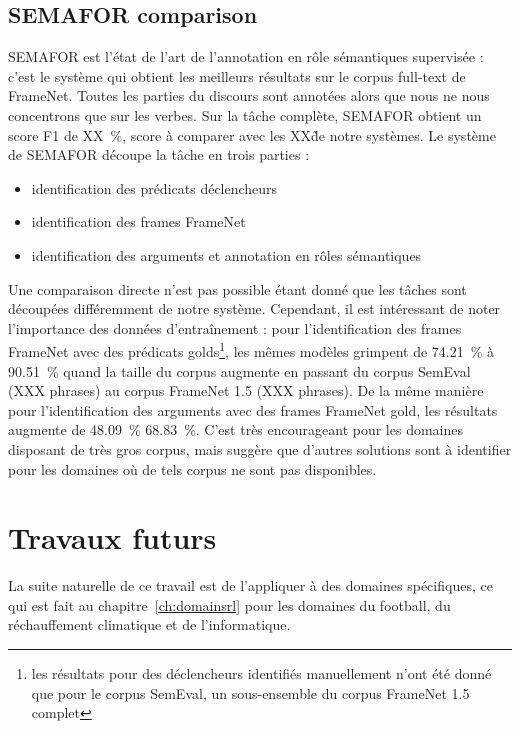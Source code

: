 \subsection{SEMAFOR comparison}

SEMAFOR \citep{das2014frame} est l'état de l'art de l'annotation en rôle
sémantiques supervisée : c'est le système qui obtient les meilleurs résultats
sur le corpus full-text de FrameNet. Toutes les parties du discours sont
annotées alors que nous ne nous concentrons que sur les verbes. Sur la tâche
complète, SEMAFOR obtient un score F1 de XX~\%, score à comparer avec les XX\~
de notre systèmes. Le système de SEMAFOR découpe la tâche en trois parties :

\begin{itemize}
    \item identification des prédicats déclencheurs
    \item identification des frames FrameNet
    \item identification des arguments et annotation en rôles sémantiques 
\end{itemize}

Une comparaison directe n'est pas possible étant donné que les tâches sont
découpées différemment de notre système. Cependant, il est intéressant de noter
l'importance des données d'entraînement : pour l'identification des frames
FrameNet avec des prédicats golds\footnote{les résultats pour des déclencheurs
identifiés manuellement n'ont été donné que pour le corpus SemEval, un
sous-ensemble du corpus FrameNet 1.5 complet}, les mêmes modèles grimpent de
74.21~\% à 90.51~\% quand la taille du corpus augmente en passant du corpus
SemEval (XXX phrases) au corpus FrameNet 1.5 (XXX phrases). De la même manière
pour l'identification des arguments avec des frames FrameNet gold, les
résultats augmente de 48.09~\% 68.83~\%. C'est très encourageant pour les
domaines disposant de très gros corpus, mais suggère que d'autres solutions
sont à identifier pour les domaines où de tels corpus ne sont pas disponibles.

\section{Travaux futurs}

La suite naturelle de ce travail est de l'appliquer à des domaines spécifiques,
ce qui est fait au chapitre~\ref{ch:domainsrl} pour les domaines du football,
du réchauffement climatique et de l'informatique.

